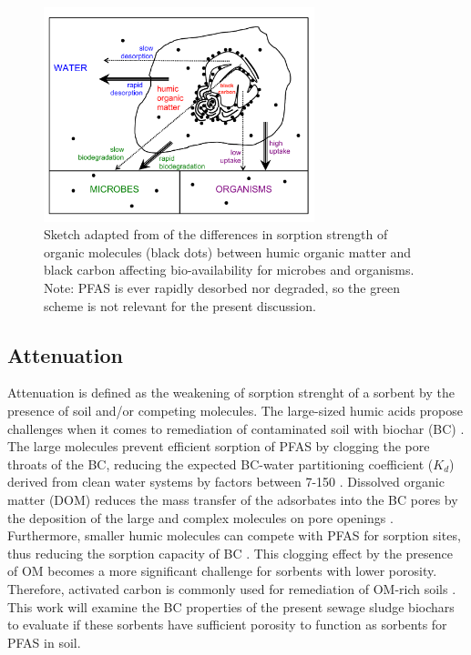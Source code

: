 \begin{figure}[htb]
    \centering
    \includegraphics[width=0.7\textwidth]{Diagrams/Cornelissen_sorption.pdf}
    \caption{Sketch adapted from \cite{Cornelissen2005} of the differences in sorption strength of organic molecules (black dots) between humic organic matter and black carbon affecting bio-availability for microbes and organisms. Note: PFAS is ever rapidly desorbed nor degraded, so the green scheme is not relevant for the present discussion.}
    \label{fig:cornelissen_sorption}
\end{figure}

\subsection{Attenuation}
Attenuation is defined as the weakening of sorption strenght of a sorbent by the presence of soil and/or competing molecules.
The large-sized humic acids propose challenges when it comes to remediation of contaminated soil with biochar (BC) \citep{mahinroosta2020review}. The large molecules prevent efficient sorption of PFAS by clogging the pore throats of the BC, reducing the expected BC-water partitioning coefficient ($K_d$) derived from clean water systems by factors between 7-150 \citep{hale2009sorption, Teixido2013, cornelissen2004sorption}. Dissolved organic matter (DOM) reduces the mass transfer of the adsorbates into the BC pores by the deposition of the large and complex molecules on pore openings \citep{pignatello2006effect}. Furthermore, smaller humic molecules can compete with PFAS for sorption sites, thus reducing the sorption capacity of BC \citep{du2014adsorption}. This clogging effect by the presence of OM becomes a more significant challenge for sorbents with lower porosity. Therefore, activated carbon is commonly used for remediation of OM-rich soils \citep{Sormo2021}. This work will examine the BC properties of the present sewage sludge biochars to evaluate if these sorbents have sufficient porosity to function as sorbents for PFAS in soil. 

